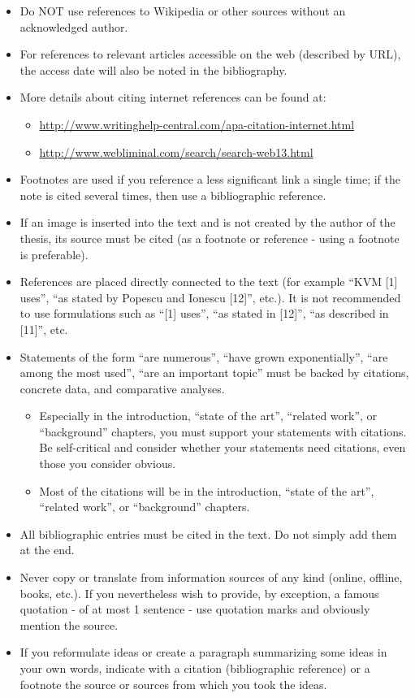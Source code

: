 \documentclass[12pt,a4paper]{report}
\begin{document}
\begin{itemize}
	\item 	Do NOT use references to Wikipedia or other sources without an acknowledged author.
	\item 	For references to relevant articles accessible on the web (described by URL), the access date will also be noted in the bibliography.
	\item 	More details about citing internet references can be found at:
	\begin{itemize}
		\item	\url{http://www.writinghelp-central.com/apa-citation-internet.html}
		\item	\url{http://www.webliminal.com/search/search-web13.html}
	\end{itemize}
	\item 	Footnotes are used if you reference a less significant link a single time; if the note is cited several times, then use a bibliographic reference.
	\item 	If an image is inserted into the text and is not created by the author of the thesis, its source must be cited (as a footnote or reference - using a footnote is preferable).
	\item 	References are placed directly connected to the text (for example ``KVM [1] uses'', ``as stated by Popescu and Ionescu [12]'', etc.). It is not recommended to use formulations such as ``[1] uses'', ``as stated in [12]'', ``as described in [11]'', etc.
	\item 	Statements of the form ``are numerous'', ``have grown exponentially'', ``are among the most used'', ``are an important topic'' must be backed by citations, concrete data, and comparative analyses.
	\begin{itemize}
		\item	Especially in the introduction, ``state of the art'', ``related work'', or ``background'' chapters, you must support your statements with citations. Be self-critical and consider whether your statements need citations, even those you consider obvious.
		\item	Most of the citations will be in the introduction, ``state of the art'', ``related work'', or ``background'' chapters.
	\end{itemize}
	\item 	All bibliographic entries must be cited in the text. Do not simply add them at the end.
	\item 	Never copy or translate from information sources of any kind (online, offline, books, etc.). If you nevertheless wish to provide, by exception, a famous quotation - of at most 1 sentence - use quotation marks and obviously mention the source.
	\item 	If you reformulate ideas or create a paragraph summarizing some ideas in your own words, indicate with a citation (bibliographic reference) or a footnote the source or sources from which you took the ideas.
\end{itemize}
\end{document}
